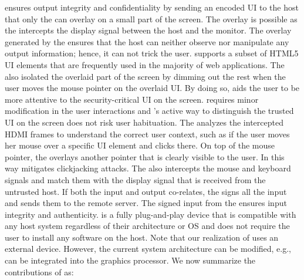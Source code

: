 \name ensures output integrity and confidentiality by sending an encoded UI to the host that only the \device can overlay on a small part of the screen. The overlay is possible as the \device intercepts the display signal between the host and the monitor. The overlay generated by the \device ensures that the host can neither observe nor manipulate any output information; hence, it can not trick the user. \device supports a subset of HTML5 UI elements that are frequently used in the majority of web applications. The \device also isolated the overlaid part of the screen by dimming out the rest when the user moves the mouse pointer on the overlaid UI. By doing so, \name aids the user to be more attentive to the security-critical UI on the screen. \name requires minor modification in the user interactions and \name's active way to distinguish the trusted UI on the screen does not risk user habituation. The \device analyzes the intercepted HDMI frames to understand the correct user context, such as if the user moves her mouse over a specific UI element and clicks there. On top of the mouse pointer, the \device overlays another pointer that is clearly visible to the user. In this way \name mitigates clickjacking attacks. The \device also intercepts the mouse and keyboard signals and match them with the display signal that is received from the untrusted host. If both the input and output co-relates, the \device signs all the input and sends them to the remote server. The signed input from the \device ensures input integrity and authenticity. \device is a fully plug-and-play device that is compatible with any host system regardless of their architecture or OS and does not require the user to install any software on the host. Note that our realization of \name uses an external device. However, the current system architecture can be modified, e.g., \device can be integrated into the graphics processor. We now summarize the contributions of \name as: 



